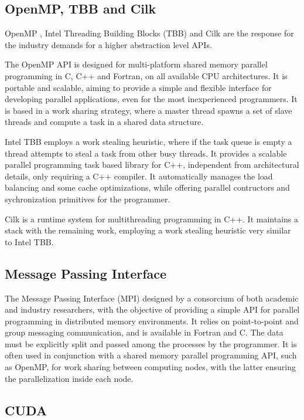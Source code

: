 \subsection{OpenMP, TBB and Cilk}
\label{OpenMP}

OpenMP \cite{OpenMP}, Intel Threading Building Blocks (TBB) \cite{Intel:TBB} and Cilk \cite{Cilk} are the response for the industry demands for a higher abstraction level APIs.

The OpenMP API is designed for multi-platform shared memory parallel programming in C, C++ and Fortran, on all available CPU architectures. It is portable and scalable, aiming to provide a simple and flexible interface for developing parallel applications, even for the most inexperienced programmers. It is based in a work sharing strategy, where a master thread spawns a set of slave threads and compute a task in a shared data structure.

Intel TBB employs a work stealing heuristic, where if the task queue is empty a thread attempts to steal a task from other busy threads. It provides a scalable parallel programming task based library for C++, independent from architectural details, only requiring a C++ compiler. It automatically manages the load balancing and some cache optimizations, while offering parallel contructors and sychronization primitives for the programmer.

Cilk is a runtime system for multithreading programming in C++. It maintains a stack with the remaining work, employing a work stealing heuristic very similar to Intel TBB.

\subsection{Message Passing Interface}
\label{MPI}

The Message Passing Interface (MPI) \cite{MPI} designed by a consorcium of both academic and industry researchers, with the objective of providing a simple API for parallel programming in distributed memory environments. It relies on point-to-point and group messaging communication, and is available in Fortran and C. The data must be explicitly split and passed among the processes by the programmer. It is often used in conjunction with a shared memory parallel programming API, such as OpenMP, for work sharing between computing nodes, with the latter ensuring the parallelization inside each node.

\subsection{CUDA}
\label{CUDA}


